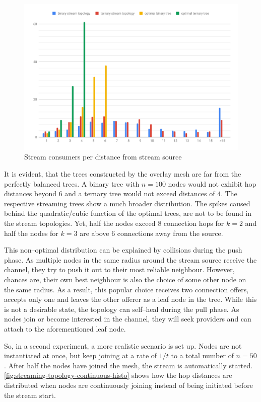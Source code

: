 \begin{figure}
\centering
\includegraphics[width=1\textwidth]{graphics/analysis/streaming-topology-histogram.pdf}
\caption{Stream consumers per distance from stream source}
\label{fig:streaming-topology-histogram}
\end{figure}

It is evident, that the trees constructed by the overlay mesh are far from the perfectly balanced trees. A binary tree with $n=100$ nodes would not exhibit hop distances beyond $6$ and a ternary tree would not exceed distances of $4$. The respective streaming trees show a much broader distribution. The spikes caused behind the quadratic/cubic function of the optimal trees, are not to be found in the stream topologies. Yet, half the nodes exceed $8$ connection hops for $k=2$ and half the nodes for $k=3$ are above $6$ connections away from the source.

This non–optimal distribution can be explained by collisions during the push phase. As multiple nodes in the same radius around the stream source receive the channel, they try to push it out to their most reliable neighbour. However, chances are, their own best neighbour is also the choice of some other node on the same radius. As a result, this popular choice receives two connection offers, accepts only one and leaves the other offerer as a leaf node in the tree. While this is not a desirable state, the topology can self–heal during the pull phase. As nodes join or become interested in the channel, they will seek providers and can attach to the aforementioned leaf node.

So, in a second experiment, a more realistic scenario is set up. Nodes are not instantiated at once, but keep joining at a rate of $1/t$ to a total number of $n=50$. After half the nodes have joined the mesh, the stream is automatically started. \vref{fig:streaming-topology-continuous-histo} shows how the hop distances are distributed when nodes are continuously joining instead of being initiated before the stream start.

